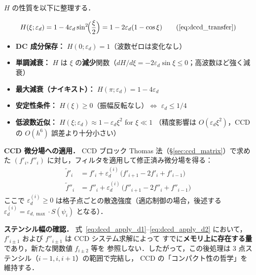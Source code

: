 $H$ の性質を以下に整理する．

\begin{tcolorbox}[resultbox, title={3 点フィルタ伝達関数 $H(\xi;\varepsilon_d)$ の性質}]
\label{box:filter_properties}
\begin{equation}
  H(\xi;\varepsilon_d) = 1 - 4\varepsilon_d\sin^2\!\Bigl(\frac{\xi}{2}\Bigr)
  = 1 - 2\varepsilon_d(1-\cos\xi)
  \tag{\ref{eq:dccd_transfer}}
\end{equation}
\begin{itemize}
  \item \textbf{DC 成分保存：} $H(0;\varepsilon_d) = 1$（波数ゼロは変化なし）
  \item \textbf{単調減衰：} $H$ は $\xi$ の\textbf{減少}関数（$dH/d\xi = -2\varepsilon_d\sin\xi \leq 0$；高波数ほど強く減衰）
  \item \textbf{最大減衰（ナイキスト）：} $H(\pi;\varepsilon_d) = 1 - 4\varepsilon_d$
  \item \textbf{安定性条件：} $H(\xi) \geq 0$（振幅反転なし）$\Leftrightarrow$ $\varepsilon_d \leq 1/4$
  \item \textbf{低波数近似：} $H(\xi;\varepsilon_d) \approx 1 - \varepsilon_d\xi^2$ for $\xi \ll 1$
        （精度影響は $O(\varepsilon_d\xi^2)$，CCD の $O(h^6)$ 誤差より十分小さい）
\end{itemize}
\end{tcolorbox}

\textbf{CCD 微分場への適用．}
CCD ブロック Thomas 法（§\ref{sec:ccd_matrix}）で求めた
$(f'_i, f''_i)$ に対し，フィルタを適用して修正済み微分場を得る：
\begin{align}
  \tilde{f}'_i  &= f'_i  + \varepsilon_d^{(i)}\,\bigl(f'_{i+1}  - 2f'_i  + f'_{i-1}\bigr)
  \label{eq:dccd_apply_d1} \\
  \tilde{f}''_i &= f''_i + \varepsilon_d^{(i)}\,\bigl(f''_{i+1} - 2f''_i + f''_{i-1}\bigr)
  \label{eq:dccd_apply_d2}
\end{align}
ここで $\varepsilon_d^{(i)} \geq 0$ は格子点ごとの散逸強度（適応制御の場合，後述する
$\varepsilon_d^{(i)} = \varepsilon_{d,\max} \cdot S(\psi_i)$ となる）．

\textbf{ステンシル幅の確認．}
式~\eqref{eq:dccd_apply_d1}--\eqref{eq:dccd_apply_d2} において，
$f'_{i\pm1}$ および $f''_{i\pm1}$ は CCD システム求解によって
すでに\textbf{メモリ上に存在する量}であり，新たな関数値 $f_{i\pm2}$ 等を
参照しない．したがって，この後処理は 3 点ステンシル（$i-1, i, i+1$）の範囲で完結し，
CCD の「コンパクト性の哲学」を維持する．

